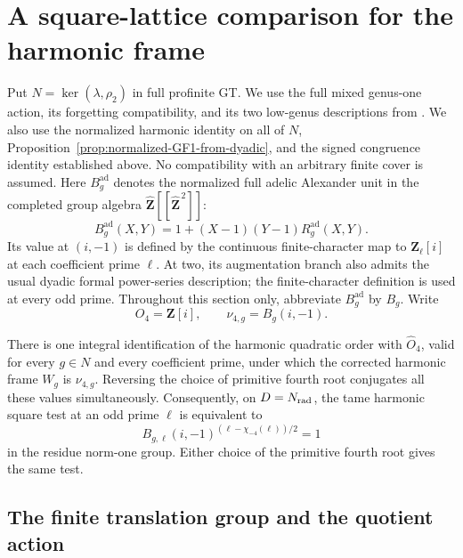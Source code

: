\section{A square-lattice comparison for the harmonic frame}
\label{sec:harmonic-beta-square-lattice}

Put \(N=\ker(\lambda,\rho_2)\) in full profinite GT.
We use the full mixed genus-one action, its forgetting compatibility,
and its two low-genus descriptions from
\cite[Lemmas~16--17]{H17}. We also use the normalized harmonic identity
on all of \(N\), Proposition~\ref{prop:normalized-GF1-from-dyadic}, and
the signed congruence identity established above.
No compatibility with an arbitrary finite cover is assumed.
Here \(B_g^{\mathrm{ad}}\) denotes the normalized full adelic
Alexander unit in the completed group algebra
\(\widehat{\mathbf Z}[[\widehat{\mathbf Z}^{\,2}]]\):
\[
 B_g^{\mathrm{ad}}(X,Y)
       =1+(X-1)(Y-1)R_g^{\mathrm{ad}}(X,Y).
\]
Its value at \((i,-1)\) is defined by the continuous finite-character
map to \(\mathbf Z_\ell[i]\) at each coefficient prime \(\ell\).
At two, its augmentation branch also admits the usual dyadic formal
power-series description; the finite-character definition is used
at every odd prime. Throughout this section only, abbreviate
\(B_g^{\mathrm{ad}}\) by \(B_g\). Write
\[
 O_4=\mathbf Z[i],\qquad
 \nu_{4,g}=B_g(i,-1).
\]

\begin{theorem}\label{thm:harmonic-beta-square-lattice}
There is one integral identification of the harmonic quadratic order
with \(\widehat O_4\), valid for every \(g\in N\) and every coefficient
prime, under which the corrected harmonic frame \(W_g\) is
\(\nu_{4,g}\). Reversing the choice of primitive fourth root conjugates
all these values simultaneously.
Consequently, on \(D=N_{\rm rad}\), the tame harmonic square
test at an odd prime \(\ell\) is equivalent to
\[
 B_{g,\ell}(i,-1)^{(\ell-\chi_{-4}(\ell))/2}=1
\]
in the residue norm-one group. Either choice of the primitive
fourth root gives the same test.
\end{theorem}

\subsection{The finite translation group and the quotient action}

